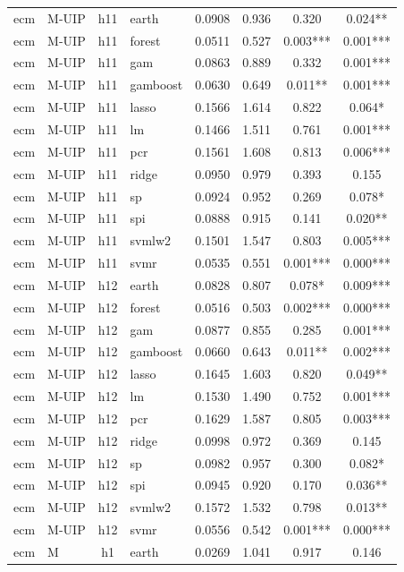 \begin{ThreePartTable}
\begin{longtable}[t]{llclcccc}
\addlinespace
ecm & M-UIP & h11 & earth & 0.0908 & 0.936 & 0.320 & 0.024**\\
ecm & M-UIP & h11 & forest & 0.0511 & 0.527 & 0.003*** & 0.001***\\
ecm & M-UIP & h11 & gam & 0.0863 & 0.889 & 0.332 & 0.001***\\
ecm & M-UIP & h11 & gamboost & 0.0630 & 0.649 & 0.011** & 0.001***\\
ecm & M-UIP & h11 & lasso & 0.1566 & 1.614 & 0.822 & 0.064*\\
ecm & M-UIP & h11 & lm & 0.1466 & 1.511 & 0.761 & 0.001***\\
ecm & M-UIP & h11 & pcr & 0.1561 & 1.608 & 0.813 & 0.006***\\
ecm & M-UIP & h11 & ridge & 0.0950 & 0.979 & 0.393 & 0.155\\
ecm & M-UIP & h11 & sp & 0.0924 & 0.952 & 0.269 & 0.078*\\
ecm & M-UIP & h11 & spi & 0.0888 & 0.915 & 0.141 & 0.020**\\
ecm & M-UIP & h11 & svmlw2 & 0.1501 & 1.547 & 0.803 & 0.005***\\
ecm & M-UIP & h11 & svmr & 0.0535 & 0.551 & 0.001*** & 0.000***\\
\addlinespace
ecm & M-UIP & h12 & earth & 0.0828 & 0.807 & 0.078* & 0.009***\\
ecm & M-UIP & h12 & forest & 0.0516 & 0.503 & 0.002*** & 0.000***\\
ecm & M-UIP & h12 & gam & 0.0877 & 0.855 & 0.285 & 0.001***\\
ecm & M-UIP & h12 & gamboost & 0.0660 & 0.643 & 0.011** & 0.002***\\
ecm & M-UIP & h12 & lasso & 0.1645 & 1.603 & 0.820 & 0.049**\\
ecm & M-UIP & h12 & lm & 0.1530 & 1.490 & 0.752 & 0.001***\\
ecm & M-UIP & h12 & pcr & 0.1629 & 1.587 & 0.805 & 0.003***\\
ecm & M-UIP & h12 & ridge & 0.0998 & 0.972 & 0.369 & 0.145\\
ecm & M-UIP & h12 & sp & 0.0982 & 0.957 & 0.300 & 0.082*\\
ecm & M-UIP & h12 & spi & 0.0945 & 0.920 & 0.170 & 0.036**\\
ecm & M-UIP & h12 & svmlw2 & 0.1572 & 1.532 & 0.798 & 0.013**\\
ecm & M-UIP & h12 & svmr & 0.0556 & 0.542 & 0.001*** & 0.000***\\
\addlinespace
ecm & M & h1 & earth & 0.0269 & 1.041 & 0.917 & 0.146\\

\end{longtable}
\end{ThreePartTable}
